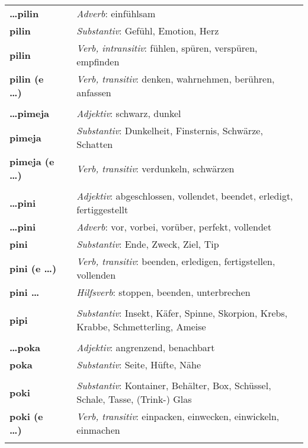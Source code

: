 \begin{supertabular}{p{2,5cm}|ll}
\textbf{\dots pilin} && \textit{Adverb}: einfühlsam \\ 
\textbf{pilin} && \textit{Substantiv}: Gefühl, Emotion, Herz \\ 
\textbf{pilin} && \textit{Verb, intransitiv}: fühlen, spüren, verspüren, empfinden \\ 
\textbf{pilin (e \dots)} && \textit{Verb, transitiv}: denken, wahrnehmen, berühren, anfassen \\ 
 && \\ %
\textbf{\dots pimeja} && \textit{Adjektiv}: schwarz, dunkel \\ 
\textbf{pimeja} && \textit{Substantiv}: Dunkelheit, Finsternis, Schwärze, Schatten \\ 
\textbf{pimeja (e \dots)} && \textit{Verb, transitiv}: verdunkeln, schwärzen \\ 
 && \\ %
\textbf{\dots pini} && \textit{Adjektiv}: abgeschlossen, vollendet, beendet, erledigt, fertiggestellt  \\ 
\textbf{\dots pini} && \textit{Adverb}: vor, vorbei, vorüber, perfekt, vollendet \\ 
\textbf{pini} && \textit{Substantiv}: Ende, Zweck, Ziel, Tip \\ 
\textbf{pini (e \dots)} && \textit{Verb, transitiv}: beenden, erledigen, fertigstellen, vollenden  \\ 
\textbf{pini \dots } && \textit{Hilfsverb}: stoppen, beenden, unterbrechen \\ 
 && \\ %
\textbf{pipi} && \textit{Substantiv}: Insekt, Käfer, Spinne, Skorpion, Krebs, Krabbe, Schmetterling, Ameise \\ 
 && \\ %
\textbf{\dots poka} && \textit{Adjektiv}: angrenzend, benachbart \\ 
\textbf{poka} && \textit{Substantiv}: Seite, Hüfte, Nähe \\ 
 && \\ %
\textbf{poki} && \textit{Substantiv}: Kontainer, Behälter, Box, Schüssel, Schale, Tasse, (Trink-) Glas \\ 
\textbf{poki (e \dots)} && \textit{Verb, transitiv}: einpacken, einwecken, einwickeln, einmachen  \\ 
 && \\ %

\end{supertabular}
